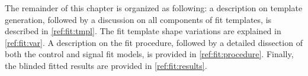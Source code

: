 The remainder of this chapter is organized as following:
a description on template generation,
followed by a discussion on all components of fit templates,
is described in \cref{ref:fit:tmpl}.
The fit template shape variations are explained in
\cref{ref:fit:var}.
A description on the fit procedure, followed by a detailed dissection of both
the control and signal fit models,
is provided in \cref{ref:fit:procedure}.
Finally, the blinded fitted results are provided in
\cref{ref:fit:results}.






